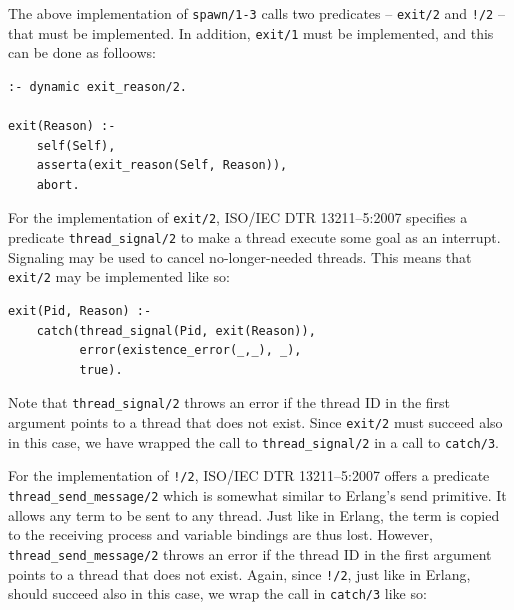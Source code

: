 The above implementation of \texttt{spawn/1-3} calls two predicates -- \texttt{exit/2} and \texttt{!/2} -- that must be implemented. In addition, \texttt{exit/1} must be implemented, and this can be done as folloows:


\begin{verbatim}
:- dynamic exit_reason/2.

exit(Reason) :-
    self(Self),
    asserta(exit_reason(Self, Reason)),
    abort.
\end{verbatim}

\noindent For the implementation of \texttt{exit/2}, ISO/IEC DTR 13211--5:2007 specifies a predicate \texttt{thread\_signal/2} to make a thread execute some goal as an interrupt. Signaling may be used to cancel no-longer-needed threads. This means that \texttt{exit/2} may be implemented like so:

\begin{verbatim}
exit(Pid, Reason) :-
    catch(thread_signal(Pid, exit(Reason)), 
          error(existence_error(_,_), _), 
          true).
\end{verbatim}

\noindent Note that \texttt{thread\_signal/2} throws an error if the thread ID in the first argument points to a thread that does not exist. Since \texttt{exit/2} must succeed also in this case, we have wrapped the call to  \texttt{thread\_signal/2} in a call to \texttt{catch/3}. 

%



For the implementation of \texttt{!/2}, ISO/IEC DTR 13211--5:2007 offers a predicate \texttt{thread\_send\_message/2} which is somewhat similar to Erlang's send primitive. It allows any term to be sent to any thread. Just like in Erlang, the term is copied to the receiving process and variable bindings are thus lost. However, \texttt{thread\_send\_message/2} throws an error if the thread ID in the first argument points to a thread that does not exist. Again, since \texttt{!/2}, just like in Erlang, should succeed also in this case, we wrap the call in \texttt{catch/3} like so:

